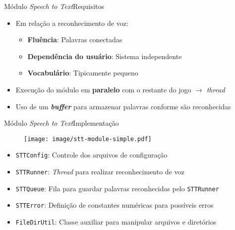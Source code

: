 \begin{frame}{Módulo \textit{Speech to Text}}{Requisitos}

\begin{itemize}
\item Em relação a reconhecimento de voz:

\begin{itemize}
\item \textbf{Fluência}: Palavras conectadas
\item<2-> \textbf{Dependência do usuário}: Sistema independente
\item<3-> \textbf{Vocabulário}: Tipicamente pequeno
\end{itemize}

\item<4-> Execução do módulo em \textbf{paralelo} com o restante do jogo $\rightarrow$ \textit{thread}

\item<5-> Uso de um \textbf{\textit{buffer}} para armazenar palavras conforme são reconhecidas
\end{itemize}
\end{frame}


\begin{frame}{Módulo \textit{Speech to Text}}{Implementação}

\begin{figure}
\texttt{[image: image/stt-module-simple.pdf]}
\end{figure}

\begin{itemize}
\item<2-> \texttt{STTConfig}: Controle dos arquivos de configuração
\item<3-> \texttt{STTRunner}: \textit{Thread} para realizar reconhecimento de voz
\item<4-> \texttt{STTQueue}: Fila para guardar palavras reconhecidas pelo \texttt{STTRunner}
\item<5-> \texttt{STTError}: Definição de constantes numéricas para possíveis erros
\item<6-> \texttt{FileDirUtil}: Classe auxiliar para manipular arquivos e diretórios
\end{itemize}

\end{frame}
